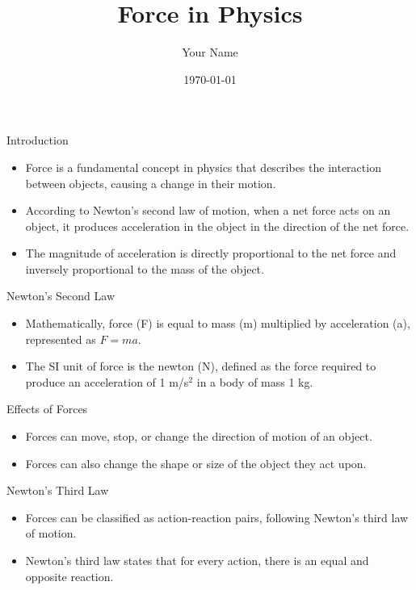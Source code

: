 \documentclass{beamer}
\title{Force in Physics}
\author{Your Name}
\date{\today}
\begin{document}
\frame{\titlepage}

\begin{frame}{Introduction}
    \begin{itemize}
        \item Force is a fundamental concept in physics that describes the interaction between objects, causing a change in their motion.
        \item According to Newton's second law of motion, when a net force acts on an object, it produces acceleration in the object in the direction of the net force.
        \item The magnitude of acceleration is directly proportional to the net force and inversely proportional to the mass of the object.
    \end{itemize}
\end{frame}

\begin{frame}{Newton's Second Law}
    \begin{itemize}
        \item Mathematically, force (F) is equal to mass (m) multiplied by acceleration (a), represented as $F = ma$.
        \item The SI unit of force is the newton (N), defined as the force required to produce an acceleration of 1 m/s$^2$ in a body of mass 1 kg.
    \end{itemize}
\end{frame}

\begin{frame}{Effects of Forces}
    \begin{itemize}
        \item Forces can move, stop, or change the direction of motion of an object.
        \item Forces can also change the shape or size of the object they act upon.
    \end{itemize}
\end{frame}

\begin{frame}{Newton's Third Law}
    \begin{itemize}
        \item Forces can be classified as action-reaction pairs, following Newton's third law of motion.
        \item Newton's third law states that for every action, there is an equal and opposite reaction.
    \end{itemize}
\end{frame}
\end{document}
